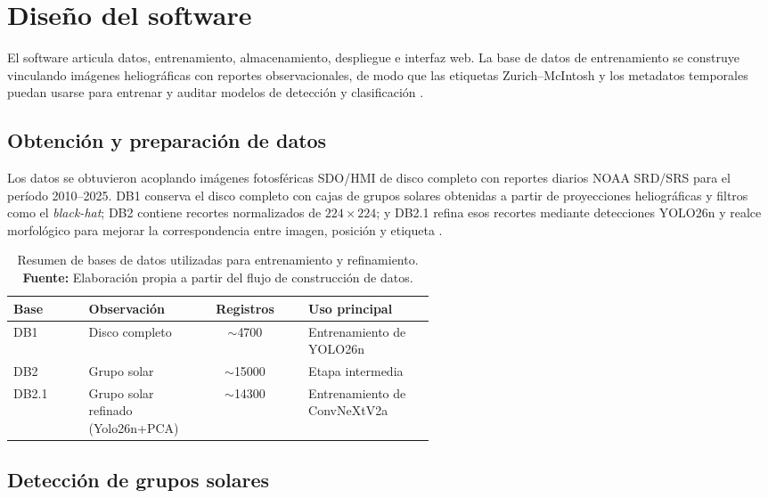 \section{Diseño del software}

El software articula datos, entrenamiento, almacenamiento, despliegue e interfaz web. La base de datos de entrenamiento se construye vinculando imágenes heliográficas con reportes observacionales, de modo que las etiquetas Zurich--McIntosh y los metadatos temporales puedan usarse para entrenar y auditar modelos de detección y clasificación \citep{noaaSRS,scherrer2012hmi,bobra2014sharp,robUSET2026}.

\subsection{Obtención y preparación de datos}

Los datos se obtuvieron acoplando imágenes fotosféricas SDO/HMI de disco completo con reportes diarios NOAA SRD/SRS para el período 2010--2025. DB1 conserva el disco completo con cajas de grupos solares obtenidas a partir de proyecciones heliográficas y filtros como el \textit{black-hat}; DB2 contiene recortes normalizados de $224\times224$; y DB2.1 refina esos recortes mediante detecciones YOLO26n y realce morfológico para mejorar la correspondencia entre imagen, posición y etiqueta \citep{scherrer2012hmi,noaaSRS,cesarHeliographic,robUSET2026}.

\begin{table}[H]
\centering
\caption{Resumen de bases de datos utilizadas para entrenamiento y refinamiento. \textbf{Fuente:} Elaboración propia a partir del flujo de construcción de datos.}
\label{tab:resumen-bases-datos}
\begin{tabular}{lp{0.25\linewidth}cp{0.30\linewidth}}
\toprule
\textbf{Base} & \textbf{Observación} & \textbf{Registros} & \textbf{Uso principal} \\
\midrule
DB1 & Disco completo & $\sim$4700 & Entrenamiento de YOLO26n \\
DB2 & Grupo solar & $\sim$15000 & Etapa intermedia \\
DB2.1 & Grupo solar refinado (Yolo26n+PCA) & $\sim$14300 & Entrenamiento de ConvNeXtV2a \\
\bottomrule
\end{tabular}
\end{table}

\subsection{Detección de grupos solares}

